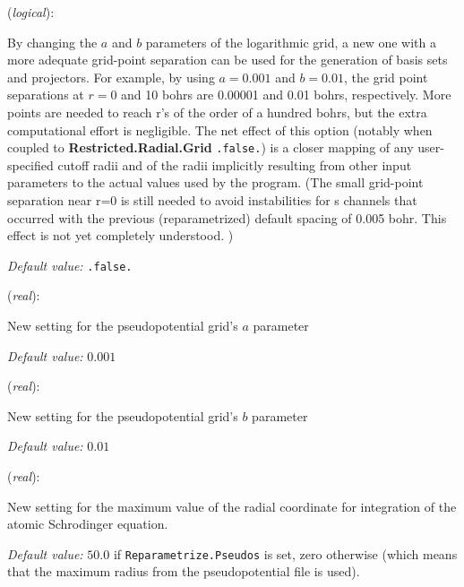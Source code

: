 \begin{description}
\itemsep 10pt
\parsep 0pt

\item[\textbf{Reparametrize.Pseudos}] (\textit{logical}):

By changing the $a$ and $b$ parameters of the logarithmic grid, a new
one with a more adequate grid-point separation can be used for the
generation of basis sets and projectors. For example, by using
$a=0.001$ and $b=0.01$, the grid point separations at $r=0$ and 10
bohrs are 0.00001 and 0.01 bohrs, respectively. More points are needed
to reach r's of the order of a hundred bohrs, but the extra
computational effort is negligible.  The net effect of this option
(notably when coupled to \textbf{Restricted.Radial.Grid} \texttt{.false.})
is a closer mapping of any user-specified cutoff radii and of the
radii implicitly resulting from other input parameters to the actual
values used by the program. (The small grid-point separation near r=0
is still needed to avoid instabilities for s channels that occurred
with the previous (reparametrized) default spacing of 0.005 bohr. This
effect is not yet completely understood. )



\textit{Default value:} \texttt{.false.}

\item[\textbf{New.A.Parameter}] (\textit{real}):

New setting for the pseudopotential grid's $a$ parameter

\textit{Default value:} { $0.001$}

\item[\textbf{New.B.Parameter}] (\textit{real}):

New setting for the pseudopotential grid's $b$ parameter

\textit{Default value:} { $0.01$}

\item[\textbf{Rmax.Radial.Grid}] (\textit{real}):

New setting for the maximum value of the radial coordinate for
integration of the atomic Schrodinger equation.

\textit{Default value:} { $50.0$} if \texttt{Reparametrize.Pseudos} is set,
zero otherwise (which means that the maximum radius from the pseudopotential
file is used).


\end{description}
